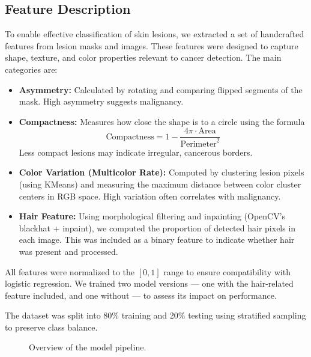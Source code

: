 \documentclass[10pt,twocolumn]{article}
\begin{document}
\subsection{Feature Description}
To enable effective classification of skin lesions, we extracted a set of handcrafted features from lesion masks and images. These features were designed to capture shape, texture, and color properties relevant to cancer detection. The main categories are:

\begin{itemize}
    \item \textbf{Asymmetry:} Calculated by rotating and comparing flipped segments of the mask. High asymmetry suggests malignancy.
    
    \item \textbf{Compactness:} Measures how close the shape is to a circle using the formula
    \[
    \text{Compactness} = 1 - \frac{4 \pi \cdot \text{Area}}{\text{Perimeter}^2}
    \]
    Less compact lesions may indicate irregular, cancerous borders.
    
    \item \textbf{Color Variation (Multicolor Rate):} Computed by clustering lesion pixels (using KMeans) and measuring the maximum distance between color cluster centers in RGB space. High variation often correlates with malignancy.
    
    \item \textbf{Hair Feature:} Using morphological filtering and inpainting (OpenCV’s blackhat + inpaint), we computed the proportion of detected hair pixels in each image. This was included as a binary feature to indicate whether hair was present and processed.
\end{itemize}

All features were normalized to the \([0, 1]\) range to ensure compatibility with logistic regression. We trained two model versions — one with the hair-related feature included, and one without — to assess its impact on performance.

The dataset was split into 80\% training and 20\% testing using stratified sampling to preserve class balance.

\begin{figure}[h]
\centering
{}
\caption{Overview of the model pipeline.}
\label{fig:pipeline}
\end{figure}
\end{document}
